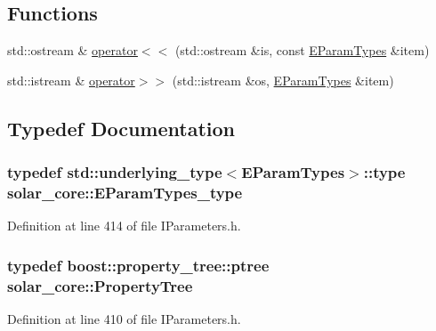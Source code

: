 \subsection*{Functions}
\begin{DoxyCompactItemize}
\item 
std\+::ostream \& \hyperlink{namespacesolar__core_aa8fea9dac434e9830aad9dea4f5ebf53}{operator$<$$<$} (std\+::ostream \&is, const \hyperlink{namespacesolar__core_aa1147341e5ef7a40d68d1bd68e149362}{E\+Param\+Types} \&item)
\item 
std\+::istream \& \hyperlink{namespacesolar__core_a82ed442d50159b64b565838515df1dba}{operator$>$$>$} (std\+::istream \&os, \hyperlink{namespacesolar__core_aa1147341e5ef7a40d68d1bd68e149362}{E\+Param\+Types} \&item)
\end{DoxyCompactItemize}


\subsection{Typedef Documentation}
\hypertarget{namespacesolar__core_a256e8e2dc052f522b522d3f90b294caf}{}
\subsubsection[{E\+Param\+Types\+\_\+type}]{\setlength{\rightskip}{0pt plus 5cm}typedef std\+::underlying\+\_\+type$<${\bf E\+Param\+Types}$>$\+::type {\bf solar\+\_\+core\+::\+E\+Param\+Types\+\_\+type}}\label{namespacesolar__core_a256e8e2dc052f522b522d3f90b294caf}


Definition at line 414 of file I\+Parameters.\+h.

\hypertarget{namespacesolar__core_adeda2737d6938c190eb774a5b2495045}{}
\subsubsection[{Property\+Tree}]{\setlength{\rightskip}{0pt plus 5cm}typedef boost\+::property\+\_\+tree\+::ptree {\bf solar\+\_\+core\+::\+Property\+Tree}}\label{namespacesolar__core_adeda2737d6938c190eb774a5b2495045}


Definition at line 410 of file I\+Parameters.\+h.

